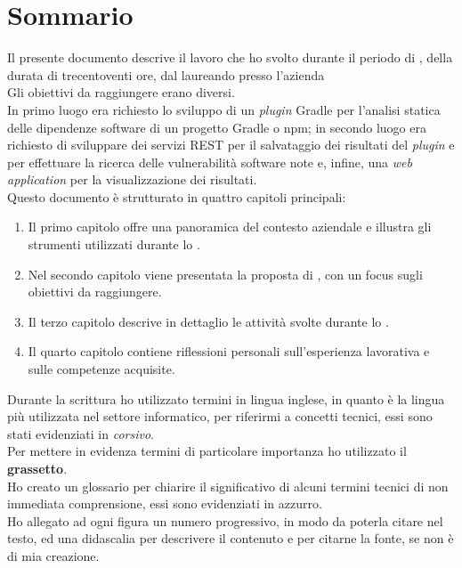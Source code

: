 \cleardoublepage
{}
{}
\begingroup
\let\clearpage\relax
\let\cleardoublepage\relax
\let\cleardoublepage\relax

\chapter*{Sommario}

Il presente documento descrive il lavoro che ho svolto durante il periodo di \stage, della durata di trecentoventi ore, 
dal laureando {\myName} presso l'azienda {\azienda} \\
Gli obiettivi da raggiungere erano diversi.\\
In primo luogo era richiesto lo sviluppo di un \textit{plugin} Gradle per l'analisi statica delle dipendenze software di un progetto Gradle o npm;
in secondo luogo era richiesto di sviluppare dei servizi REST per il salvataggio dei risultati del \textit{plugin} e per effettuare la ricerca
delle vulnerabilità software note e, infine,
una \textit{web application} per la visualizzazione dei risultati.\\
Questo documento è strutturato in quattro capitoli principali:
\begin{enumerate}
    \item Il primo capitolo offre una panoramica del contesto aziendale e illustra gli strumenti utilizzati durante lo \stage.
    \item Nel secondo capitolo viene presentata la proposta di \stage, con un focus sugli obiettivi da raggiungere.
    \item Il terzo capitolo descrive in dettaglio le attività svolte durante lo \stage.
    \item Il quarto capitolo contiene riflessioni personali sull'esperienza lavorativa e sulle competenze acquisite.
\end{enumerate}

\noindent Durante la scrittura ho utilizzato termini in lingua inglese, in quanto è la lingua più utilizzata nel settore informatico, 
per riferirmi a concetti tecnici, essi sono stati evidenziati in \textit{corsivo}.\\
Per mettere in evidenza termini di particolare importanza ho utilizzato il \textbf{grassetto}.\\
Ho creato un glossario per chiarire il significativo di alcuni termini tecnici di non immediata comprensione, essi sono evidenziati in azzurro.\\
Ho allegato ad ogni figura un numero progressivo, in modo da poterla citare nel testo, ed una didascalia per descrivere il contenuto
e per citarne la fonte, se non è di mia creazione.\\





\endgroup

\vfill
